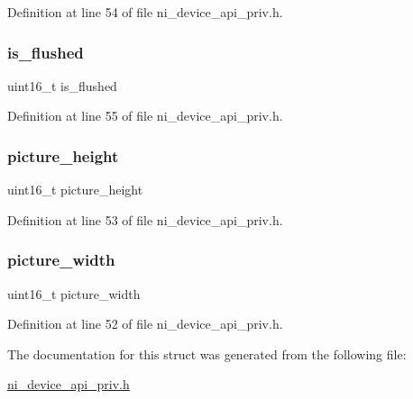 Definition at line 54 of file ni\+\_\+device\+\_\+api\+\_\+priv.\+h.

\mbox{\label{struct__ni__instance__mgr__stream__info_a53f8d848132d487dcb862de1e6ccbac7}} 
\subsubsection{\texorpdfstring{is\_flushed}{is\_flushed}}
{\footnotesize\ttfamily uint16\+\_\+t is\+\_\+flushed}



Definition at line 55 of file ni\+\_\+device\+\_\+api\+\_\+priv.\+h.

\mbox{\label{struct__ni__instance__mgr__stream__info_a6bd8a255766c1b1b0c3cc01169b673a1}} 
\subsubsection{\texorpdfstring{picture\_height}{picture\_height}}
{\footnotesize\ttfamily uint16\+\_\+t picture\+\_\+height}



Definition at line 53 of file ni\+\_\+device\+\_\+api\+\_\+priv.\+h.

\mbox{\label{struct__ni__instance__mgr__stream__info_ae92adc42ff99cfbf1d1eae8b13d7bd75}} 
\subsubsection{\texorpdfstring{picture\_width}{picture\_width}}
{\footnotesize\ttfamily uint16\+\_\+t picture\+\_\+width}



Definition at line 52 of file ni\+\_\+device\+\_\+api\+\_\+priv.\+h.



The documentation for this struct was generated from the following file\+:\begin{DoxyCompactItemize}
\item 
\mbox{\hyperlink{ni__device__api__priv_8h}{ni\+\_\+device\+\_\+api\+\_\+priv.\+h}}\end{DoxyCompactItemize}
